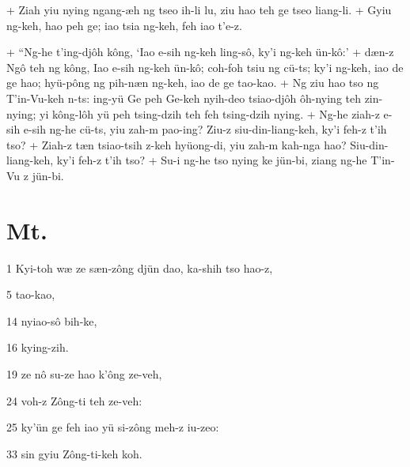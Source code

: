 +	Ziah yiu nying ngang-æh ng tseo ih-li lu, ziu hao teh ge tseo liang-li.
+	Gyiu ng-keh, hao peh ge; iao tsia ng-keh, feh iao t'e-z.
\par
+	``Ng-he t'ing-djôh kông, `Iao e-sih ng-keh ling-sô, ky'i ng-keh ün-kô:'
+	dæn-z Ngô teh ng kông, Iao e-sih ng-keh ün-kô; coh-foh tsiu ng cü-ts; ky'i ng-keh, iao de ge hao; hyü-pông ng pih-næn ng-keh, iao de ge tao-kao.
+	Ng ziu hao tso ng T'in-Vu-keh n-ts: ing-yü Ge peh Ge-keh nyih-deo tsiao-djôh ôh-nying teh zin-nying; yi kông-lôh yü peh tsing-dzih teh feh tsing-dzih nying.
+	Ng-he ziah-z e-sih e-sih ng-he cü-ts, yiu zah-m pao-ing? Ziu-z siu-din-liang-keh, ky'i feh-z t'ih tso?
+	Ziah-z tæn tsiao-tsih z-keh hyüong-di, yiu zah-m kah-nga hao? Siu-din-liang-keh, ky'i feh-z t'ih tso?
+	Su-i ng-he tso nying ke jün-bi, ziang ng-he T'in-Vu z jün-bi.



\section{Mt.}%

\begin{sAbstract}
	\item[1] Kyi-toh wæ ze sæn-zông djün dao, ka-shih tso hao-z,
	\item[5] tao-kao,
	\item[14] nyiao-sô bih-ke,
	\item[16] kying-zih.
	\item[19] ze nô su-ze hao k'ông ze-veh,
	\item[24] voh-z Zông-ti teh ze-veh:
	\item[25] ky'ün ge feh iao yü si-zông meh-z iu-zeo:
	\item[33] sin gyiu Zông-ti-keh koh.
\end{sAbstract}

